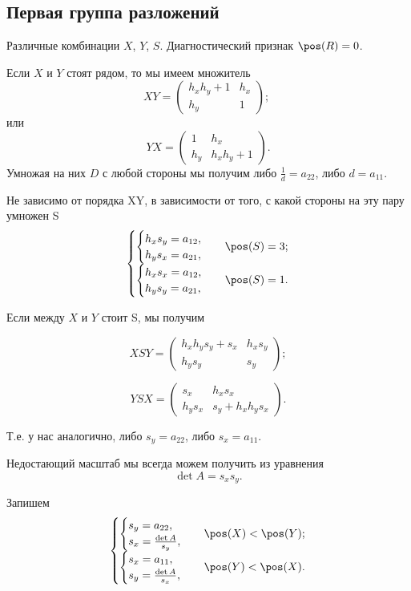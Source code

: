 \subsection{Первая группа разложений}

Различные комбинации $X$, $Y$, $S$.
Диагностический признак $\pos(R)=0$.

Если $X$ и $Y$ стоят рядом, то мы имеем множитель
$$XY = \begin{pmatrix}
	h_xh_y+1 & h_x \\
	h_y & 1
\end{pmatrix};\;
$$
или
$$
YX = \begin{pmatrix}
	1 & h_x \\
	h_y & h_xh_y+1
\end{pmatrix}.$$
Умножая на них $D$ с любой стороны мы получим либо $\frac{1}{d} = a_{22}$, либо $d = a_{11}$.

Не зависимо от порядка XY, в зависимости от того, с какой стороны на эту пару умножен S
$$\begin{cases}
	\begin{cases}
		h_xs_y = a_{12},\\
		h_ys_x = a_{21},
	\end{cases}
	& \pos(S)=3;\\
	\begin{cases}
		h_xs_x = a_{12},\\
		h_ys_y = a_{21},
	\end{cases}
	& \pos(S)=1.
\end{cases}
$$


Если между $X$ и $Y$ стоит S, мы получим

$$XSY =
\begin{pmatrix}
	h_x h_y s_y + s_x & h_x s_y \\
	h_y s_y  & s_y
\end{pmatrix};
$$

$$YSX =
\begin{pmatrix}
s_x & h_x s_x\\
h_y s_x & s_y + h_x h_y s_x
\end{pmatrix}.
$$

Т.е. у нас аналогично, либо $s_y = a_{22}$, либо $s_x = a_{11}$.

Недостающий масштаб мы всегда можем получить из уравнения
$$\det A = s_x s_y.$$

Запишем
$$\begin{cases}
	\begin{cases}
		s_y = a_{22},\\
		s_x = \frac{\det{A}}{s_y},\\
	\end{cases} & \pos(X)<\pos(Y);\\
	\begin{cases}
		s_x = a_{11},\\
		s_y = \frac{\det{A}}{s_x},\\
	\end{cases} & \pos(Y)<\pos(X).
\end{cases}$$


